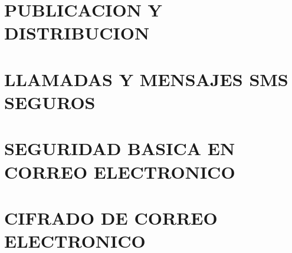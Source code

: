 \documentclass[oribibl,oneside,pdftext]{scrbook}
\begin{document}
\chapter{PUBLICACION Y DISTRIBUCION}
\clearpage

\clearpage

\clearpage

\graphicspath{{./capitulo_05_LLAMADAS_Y_MENSAJES_SMS_SEGUROS/}}
\chapter{LLAMADAS Y MENSAJES SMS SEGUROS}
\clearpage

\clearpage

\graphicspath{{./capitulo_06_SEGURIDAD_BASICA_EN_CORREO_ELECTRONICO/}}
\chapter{SEGURIDAD BASICA EN CORREO ELECTRONICO}
\clearpage

\clearpage

\clearpage

\graphicspath{{./capitulo_07_CIFRADO_DE_CORREO_ELECTRONICO/}}
\chapter{CIFRADO DE CORREO ELECTRONICO}
\clearpage

\clearpage

\clearpage

\clearpage

\clearpage

\clearpage

\clearpage

\clearpage

\graphicspath{{./capitulo_08_NAVEGACION_SEGURA/}}
\end{document}
